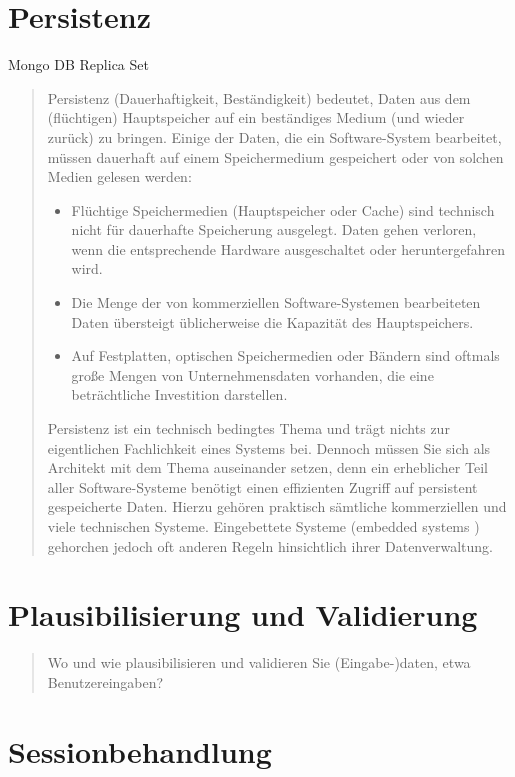 \section{Persistenz}
\label{persistenz}

Mongo DB
Replica Set

\begin{quote}
	Persistenz (Dauerhaftigkeit, Beständigkeit) bedeutet, Daten aus dem (flüchtigen) Hauptspeicher auf ein beständiges Medium (und wieder zurück) zu bringen.
	Einige der Daten, die ein Software-System bearbeitet, müssen dauerhaft auf einem Speichermedium gespeichert oder von solchen Medien gelesen werden:
	\begin{itemize}
		\item Flüchtige Speichermedien (Hauptspeicher oder Cache) sind technisch nicht für dauerhafte Speicherung ausgelegt. Daten gehen verloren, wenn die entsprechende Hardware ausgeschaltet oder heruntergefahren wird.
		\item Die Menge der von kommerziellen Software-Systemen bearbeiteten Daten übersteigt üblicherweise die Kapazität des Hauptspeichers.
		\item Auf Festplatten, optischen Speichermedien oder Bändern sind oftmals große Mengen von Unternehmensdaten vorhanden, die eine beträchtliche Investition darstellen.
	\end{itemize}
	Persistenz ist ein technisch bedingtes Thema und trägt nichts zur eigentlichen Fachlichkeit eines Systems bei. Dennoch müssen Sie sich als Architekt mit dem Thema auseinander setzen, denn ein erheblicher Teil aller Software-Systeme benötigt einen effizienten Zugriff auf persistent gespeicherte Daten. Hierzu gehören praktisch sämtliche kommerziellen und viele technischen Systeme. Eingebettete Systeme (embedded systems ) gehorchen jedoch oft anderen Regeln hinsichtlich ihrer Datenverwaltung.
\end{quote}

\section{Plausibilisierung und Validierung}

\begin{quote}
	Wo und wie plausibilisieren und validieren Sie (Eingabe-)daten, etwa Benutzereingaben?
\end{quote}

\section{Sessionbehandlung}

